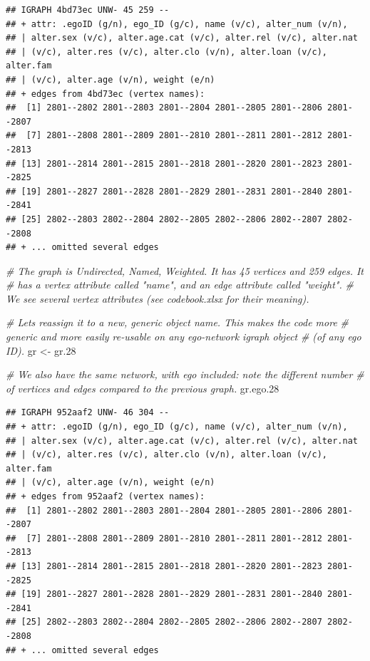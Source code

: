 \documentclass[
]{book}
\newenvironment{Shaded}{\begin{snugshade}}{\end{snugshade}}
\newcommand{\CommentTok}[1]{\textcolor[rgb]{0.56,0.35,0.01}{\textit{#1}}}
\newcommand{\FloatTok}[1]{\textcolor[rgb]{0.00,0.00,0.81}{#1}}
\newcommand{\NormalTok}[1]{#1}
\newcommand{\OtherTok}[1]{\textcolor[rgb]{0.56,0.35,0.01}{#1}}
\begin{document}
\begin{verbatim}
## IGRAPH 4bd73ec UNW- 45 259 -- 
## + attr: .egoID (g/n), ego_ID (g/c), name (v/c), alter_num (v/n),
## | alter.sex (v/c), alter.age.cat (v/c), alter.rel (v/c), alter.nat
## | (v/c), alter.res (v/c), alter.clo (v/n), alter.loan (v/c), alter.fam
## | (v/c), alter.age (v/n), weight (e/n)
## + edges from 4bd73ec (vertex names):
##  [1] 2801--2802 2801--2803 2801--2804 2801--2805 2801--2806 2801--2807
##  [7] 2801--2808 2801--2809 2801--2810 2801--2811 2801--2812 2801--2813
## [13] 2801--2814 2801--2815 2801--2818 2801--2820 2801--2823 2801--2825
## [19] 2801--2827 2801--2828 2801--2829 2801--2831 2801--2840 2801--2841
## [25] 2802--2803 2802--2804 2802--2805 2802--2806 2802--2807 2802--2808
## + ... omitted several edges
\end{verbatim}

\begin{Shaded}
\begin{Highlighting}[]
\CommentTok{\# The graph is Undirected, Named, Weighted. It has 45 vertices and 259 edges. It}
\CommentTok{\# has a vertex attribute called "name", and an edge attribute called "weight". }
\CommentTok{\# We see several vertex attributes (see codebook.xlsx for their meaning).}

\CommentTok{\# Let\textquotesingle{}s reassign it to a new, generic object name. This makes the code more }
\CommentTok{\# generic and more easily re{-}usable on any ego{-}network igraph object }
\CommentTok{\# (of any ego ID).}
\NormalTok{gr }\OtherTok{\textless{}{-}}\NormalTok{ gr}\FloatTok{.28}

\CommentTok{\# We also have the same network, with ego included: note the different number}
\CommentTok{\# of vertices and edges compared to the previous graph.}
\NormalTok{gr.ego}\FloatTok{.28}
\end{Highlighting}
\end{Shaded}

\begin{verbatim}
## IGRAPH 952aaf2 UNW- 46 304 -- 
## + attr: .egoID (g/n), ego_ID (g/c), name (v/c), alter_num (v/n),
## | alter.sex (v/c), alter.age.cat (v/c), alter.rel (v/c), alter.nat
## | (v/c), alter.res (v/c), alter.clo (v/n), alter.loan (v/c), alter.fam
## | (v/c), alter.age (v/n), weight (e/n)
## + edges from 952aaf2 (vertex names):
##  [1] 2801--2802 2801--2803 2801--2804 2801--2805 2801--2806 2801--2807
##  [7] 2801--2808 2801--2809 2801--2810 2801--2811 2801--2812 2801--2813
## [13] 2801--2814 2801--2815 2801--2818 2801--2820 2801--2823 2801--2825
## [19] 2801--2827 2801--2828 2801--2829 2801--2831 2801--2840 2801--2841
## [25] 2802--2803 2802--2804 2802--2805 2802--2806 2802--2807 2802--2808
## + ... omitted several edges
\end{verbatim}
\end{document}
